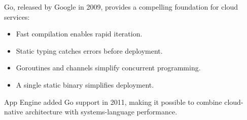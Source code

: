 Go, released by Google in 2009, provides a compelling foundation for cloud services:
\begin{itemize}
\item Fast compilation enables rapid iteration.
\item Static typing catches errors before deployment.
\item Goroutines and channels simplify concurrent programming.
\item A single static binary simplifies deployment.
\end{itemize}

App Engine added Go support in 2011, making it possible to combine cloud-native architecture with systems-language performance.


